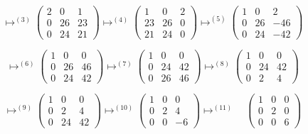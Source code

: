 \[
\longmapsto^{(3)} \left(\begin{array}{ccc} 2 & 0 & 1 \\ 0 & 26 & 23 \\ 0 & 24 & 21 \end{array}\right)
\longmapsto^{(4)} \left(\begin{array}{ccc} 1 & 0 & 2 \\ 23 & 26 & 0 \\ 21 & 24 & 0 \end{array}\right)
\longmapsto^{(5)} \left(\begin{array}{ccc} 1 & 0 & 2 \\ 0 & 26 & -46 \\ 0 & 24 & -42 \end{array}\right)\]

\[
\longmapsto^{(6)} \left(\begin{array}{ccc} 1 & 0 & 0 \\ 0 & 26 & 46 \\ 0 & 24 & 42 \end{array}\right)
\longmapsto^{(7)} \left(\begin{array}{ccc} 1 & 0 & 0 \\ 0 & 24 & 42 \\ 0 & 26 & 46 \end{array}\right)
\longmapsto^{(8)} \left(\begin{array}{ccc} 1 & 0 & 0 \\ 0 & 24 & 42 \\ 0 & 2 & 4 \end{array}\right)\]

\[
\longmapsto^{(9)} \left(\begin{array}{ccc} 1 & 0 & 0 \\ 0 & 2 & 4 \\ 0 & 24 & 42 \end{array}\right)
\longmapsto^{(10)} \left(\begin{array}{ccc} 1 & 0 & 0 \\ 0 & 2 & 4 \\ 0 & 0 & -6 \end{array}\right)
\longmapsto^{(11)} \quad \left(\begin{array}{ccc} 1 & 0 & 0 \\ 0 & 2 & 0 \\ 0 & 0 & 6 \end{array}\right)\]

